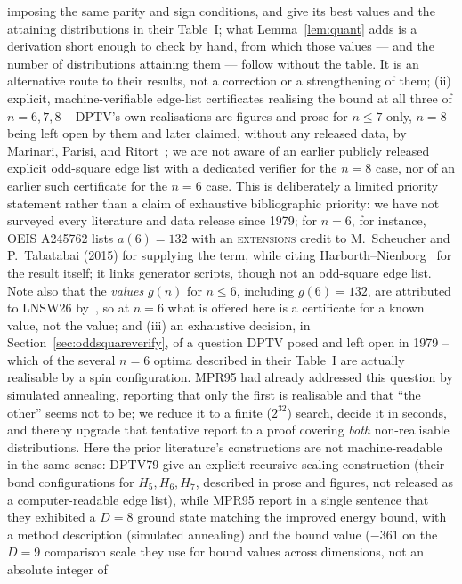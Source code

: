 \documentclass[12pt,a4paper]{article}
\theoremstyle{definition}
\begin{document}
imposing the same parity and sign conditions, and give its best values and the
attaining distributions in their Table~I; what Lemma~\ref{lem:quant} adds is a
derivation short enough to check by hand, from which those values --- and the
number of distributions attaining them --- follow without the table. It is an
alternative route to their results, not a correction or a strengthening of
them;
(ii) explicit, machine-verifiable edge-list certificates realising the
bound at all three of $n=6,7,8$ -- DPTV's own realisations are
figures and prose for $n\le7$ only, $n=8$ being left open by them and
later claimed, without any released data, by Marinari, Parisi, and
Ritort~\cite{MPR95}; we are not aware of an earlier publicly released explicit odd-square
edge list with a dedicated verifier for the $n=8$ case, nor of an earlier
such certificate for the $n=6$ case. This is deliberately a limited
priority statement rather than a claim of exhaustive bibliographic priority:
we have not surveyed every literature and data release since 1979; for $n=6$,
for instance, OEIS A245762 lists $a(6)=132$ with an
\textsc{extensions} credit to M.~Scheucher and P.~Tabatabai (2015) for
supplying the term, while citing Harborth--Nienborg~\cite{HN94} for the result
itself; it links generator scripts, though not an odd-square edge list.
Note also that the \emph{values} $g(n)$ for $n\le6$, including $g(6)=132$, are
attributed to LNSW26 by~\cite{Emlek26}, so at $n=6$ what is offered
here is a certificate for a known value, not the value; and (iii) an exhaustive decision, in Section~\ref{sec:oddsquareverify},
of a question DPTV posed and left open in 1979 -- which of the
several $n=6$ optima described in their Table~I are actually realisable by a
spin configuration. MPR95 had already addressed this question by simulated
annealing, reporting that only the first is realisable and that ``the other''
seems not to be; we reduce it to a finite ($2^{32}$) search, decide it in
seconds, and thereby upgrade that tentative report to a proof covering
\emph{both} non-realisable distributions. Here the prior literature's
constructions are not machine-readable in the same sense: DPTV79 give
an explicit recursive scaling construction (their bond configurations
for $H_5,H_6,H_7$, described in prose and figures, not released as a
computer-readable edge list), while MPR95 report in a single sentence that they exhibited a $D=8$ ground
state matching the improved energy bound, with a method description (simulated
annealing) and the bound value ($-361$ on the $D{=}9$ comparison scale
they use for bound values across dimensions, not an absolute integer of
\end{document}
